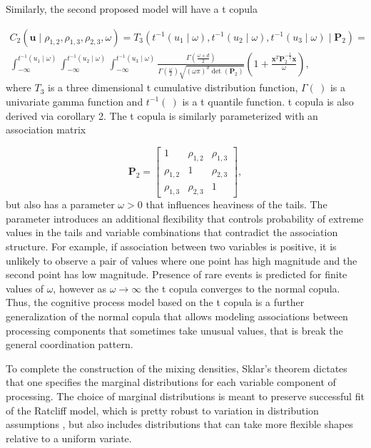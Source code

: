 \documentclass[12pt]{article}
\begin{document}
	Similarly, the second proposed model will have a t copula 
    
\begin{eqnarray}
C_2(\boldsymbol{u} \mid \rho_{1,2},\rho_{1,3},\rho_{2,3},\omega) = T_3(t^{-1}(u_1 \mid \omega),t^{-1}(u_2 \mid \omega),t^{-1}(u_3 \mid \omega) \mid \boldsymbol{P}_2) = \nonumber \\ 
\int_{-\infty}^{t^{-1}(u_1 \mid \omega)}\int_{-\infty}^{t^{-1}(u_2 \mid \omega)}\int_{-\infty}^{t^{-1}(u_3 \mid \omega)}\frac{\Gamma(\frac{\omega+d}{2})}{\Gamma(\frac{\omega}{2})\sqrt{(\omega\pi)^d \operatorname{det}(\boldsymbol{P}_2)}}\left(1+\frac{\boldsymbol{x}^T\boldsymbol{P}_2^{-\frac{1}{2}}\boldsymbol{x}}{\omega}\right),
\end{eqnarray}
where $T_3$ is a three dimensional t cumulative distribution function, $\Gamma(\:)$ is a univariate gamma function and $t^{-1}(\:)$ is a t quantile function. t copula is also derived via corollary 2. The t copula is similarly parameterized with an association matrix  

\begin{equation}
\boldsymbol{P}_2 = \left[ \begin{array}{ccc}
1 & \rho_{1, 2} & \rho_{1, 3} \\
\rho_{1, 2} & 1 & \rho_{2, 3} \\
\rho_{1, 3} & \rho_{2, 3} & 1
\end{array}
\right],
\end{equation}
but also has a parameter $\omega > 0$ that influences heaviness of the tails. The parameter introduces an additional flexibility that controls probability of extreme values in the tails and variable combinations that contradict the association structure. For example, if association between two variables is positive, it is unlikely to observe a pair of values where one point has high magnitude and the second point has low magnitude. Presence of rare events is predicted for finite values of $\omega$, however as $\omega \to \infty$ the t copula converges to the normal copula. Thus, the cognitive process model based on the t copula is a further generalization of the normal copula that allows modeling associations between processing components that sometimes take unusual values, that is break the general coordination pattern.

	To complete the construction of the mixing densities, Sklar’s theorem dictates that one specifies the marginal distributions for each variable component of processing. The choice of marginal distributions is meant to preserve successful fit of the Ratcliff model, which is pretty robust to variation in distribution assumptions \citet{Rat2013}, but also includes distributions that can take more flexible shapes relative to a uniform variate. 
    
\end{document}
